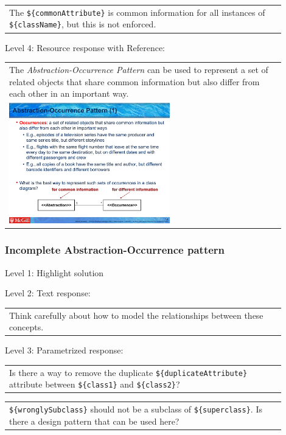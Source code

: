 \begin{tabular}{|p{0.9\linewidth}}
The \verb|${commonAttribute}| is common information for all instances of \verb|${className}|, but this is not enforced.
\end{tabular} \medskip

\noindent Level 4: Resource response with Reference: \medskip

\begin{tabular}{|p{0.9\linewidth}}
The \textit{Abstraction-Occurrence Pattern} can be used to 
represent a set of related objects that share common information but also differ
from each other in an important way.

\\
\includegraphics[width=0.6\textwidth]{images/abstraction_occurrence.png}
\end{tabular} \medskip


\subsubsection{Incomplete Abstraction-Occurrence pattern}

\noindent Level 1: Highlight solution \medskip

\noindent Level 2: Text response: \medskip

\begin{tabular}{|p{0.9\linewidth}}
Think carefully about how to model the relationships between these concepts.
\end{tabular} \medskip

\noindent Level 3: Parametrized response: \medskip

\begin{tabular}{|p{0.9\linewidth}}
Is there a way to remove the duplicate \verb|${duplicateAttribute}| attribute between \verb|${class1}| and \verb|${class2}|?
\end{tabular} \medskip

\begin{tabular}{|p{0.9\linewidth}}
\verb|${wronglySubclass}| should not be a subclass of \verb|${superclass}|. Is there a design pattern that can be used here?
\end{tabular} \medskip

